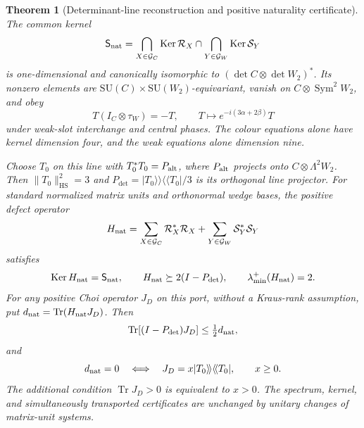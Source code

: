 \documentclass[11pt]{article}
\numberwithin{equation}{section}
\newtheorem{theorem}{Theorem}[section]
\theoremstyle{definition}
\theoremstyle{remark}
\newcommand{\Tr}{\operatorname{Tr}}
\newcommand{\Ker}{\operatorname{Ker}}
\newcommand{\SU}{\mathrm{SU}}
\newcommand{\HS}{\mathrm{HS}}
\begin{document}
\begin{theorem}[Determinant-line reconstruction and positive naturality certificate]
\label{thm:six-naturality}
The common kernel
\begin{equation}
 \mathsf S_{\rm nat}=\bigcap_{X\in\mathcal G_C}\Ker\mathcal R_X
                  \cap\bigcap_{Y\in\mathcal G_W}\Ker\mathcal S_Y
 \label{eq:naturality-kernel}
\end{equation}
is one-dimensional and canonically isomorphic to
$(\det C\otimes\det W_2)^*$.  Its nonzero elements are
$\SU(C)\times\SU(W_2)$-equivariant, vanish on
$C\otimes\operatorname{Sym}^2W_2$, and obey
\begin{equation}
 T(I_C\otimes\tau_W)=-T,\qquad
 T\longmapsto e^{-i(3\alpha+2\beta)}T
 \label{eq:naturality-swap-character}
\end{equation}
under weak-slot interchange and central phases.  The colour equations alone
have kernel dimension four, and the weak equations alone dimension nine.

Choose $T_0$ on this line with $T_0^*T_0=P_{\rm alt}$, where $P_{\rm alt}$
projects onto $C\otimes\Lambda^2W_2$.  Then $\|T_0\|_{\HS}^2=3$ and
$P_{\det}=|T_0\rangle\!\rangle\langle\!\langle T_0|/3$ is its orthogonal
line projector.  For standard normalized matrix units and orthonormal wedge
bases, the positive defect operator
\begin{equation}
 H_{\rm nat}=\sum_{X\in\mathcal G_C}\mathcal R_X^*\mathcal R_X
           +\sum_{Y\in\mathcal G_W}\mathcal S_Y^*\mathcal S_Y
 \label{eq:naturality-operator}
\end{equation}
satisfies
\begin{equation}
 \Ker H_{\rm nat}=\mathsf S_{\rm nat},\qquad
 H_{\rm nat}\succeq2(I-P_{\det}),\qquad
 \lambda_{\min}^+(H_{\rm nat})=2.
 \label{eq:naturality-gap}
\end{equation}
For any positive Choi operator $J_D$ on this port, without a Kraus-rank
assumption, put $d_{\rm nat}=\Tr(H_{\rm nat}J_D)$.  Then
\begin{equation}
 \Tr[(I-P_{\det})J_D]\le\tfrac12d_{\rm nat},
 \label{eq:naturality-leakage}
\end{equation}
and
\begin{equation}
 d_{\rm nat}=0\quad\Longleftrightarrow\quad
 J_D=x|T_0\rangle\!\rangle\langle\!\langle T_0|,\qquad x\ge0.
 \label{eq:naturality-ray}
\end{equation}
The additional condition $\Tr J_D>0$ is equivalent to $x>0$.
The spectrum, kernel, and simultaneously transported certificates are
unchanged by unitary changes of matrix-unit systems.
\end{theorem}
\end{document}
